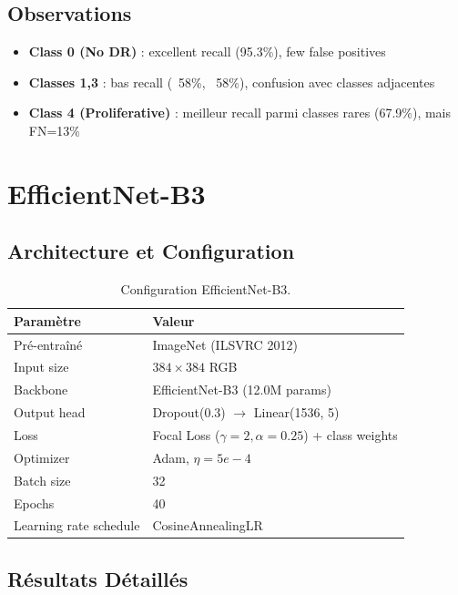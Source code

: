 \documentclass[12pt,a4paper,oneside]{report}
\begin{document}
\subsection{Observations}

\begin{itemize}
    \item \textbf{Class 0 (No DR)} : excellent recall (95.3\%), 
          few false positives
    \item \textbf{Classes 1,3} : bas recall (~58\%, ~58\%), 
          confusion avec classes adjacentes
    \item \textbf{Class 4 (Proliferative)} : meilleur recall 
          parmi classes rares (67.9\%), mais FN=13\%
\end{itemize}

\section{EfficientNet-B3}

\subsection{Architecture et Configuration}

\begin{table}[H]
\centering
\begin{tabular}{|l|l|}
\hline
\textbf{Paramètre} & \textbf{Valeur} \\
\hline
Pré-entraîné & ImageNet (ILSVRC 2012) \\
Input size & $384 \times 384$ RGB \\
Backbone & EfficientNet-B3 (12.0M params) \\
Output head & Dropout(0.3) $\to$ Linear(1536, 5) \\
Loss & Focal Loss ($\gamma = 2, \alpha = 0.25$) + class weights \\
Optimizer & Adam, $\eta = 5e-4$ \\
Batch size & 32 \\
Epochs & 40 \\
Learning rate schedule & CosineAnnealingLR \\
\hline
\end{tabular}
\caption{Configuration EfficientNet-B3.}
\label{tab:effnet_config}
\end{table}

\subsection{Résultats Détaillés}
\end{document}
